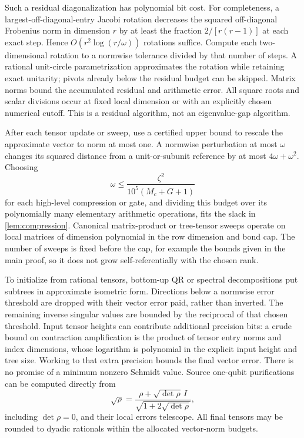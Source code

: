 \documentclass[11pt,reqno]{amsart}
\numberwithin{equation}{section}
\theoremstyle{definition}
\theoremstyle{remark}
\begin{document}
Such a residual diagonalization has polynomial bit cost. For completeness, a largest-off-diagonal-entry Jacobi rotation decreases the squared off-diagonal Frobenius norm in dimension $r$ by at least the fraction $2/[r(r-1)]$ at each exact step. Hence $O(r^2\log(r/\omega))$ rotations suffice. Compute each two-dimensional rotation to a normwise tolerance divided by that number of steps. A rational unit-circle parametrization approximates the rotation while retaining exact unitarity; pivots already below the residual budget can be skipped. Matrix norms bound the accumulated residual and arithmetic error. All square roots and scalar divisions occur at fixed local dimension or with an explicitly chosen numerical cutoff. This is a residual algorithm, not an eigenvalue-gap algorithm.

After each tensor update or sweep, use a certified upper bound to rescale the approximate vector to norm at most one. A normwise perturbation at most $\omega$ changes its squared distance from a unit-or-subunit reference by at most $4\omega+\omega^2$. Choosing
\[
 \omega\leq\frac{\zeta^2}{10^5(M_c+G+1)}
\]
for each high-level compression or gate, and dividing this budget over its polynomially many elementary arithmetic operations, fits the slack in \cref{lem:compression}. Canonical matrix-product or tree-tensor sweeps operate on local matrices of dimension polynomial in the row dimension and bond cap. The number of sweeps is fixed before the cap, for example the bounds given in the main proof, so it does not grow self-referentially with the chosen rank.

To initialize from rational tensors, bottom-up QR or spectral decompositions put subtrees in approximate isometric form. Directions below a normwise error threshold are dropped with their vector error paid, rather than inverted. The remaining inverse singular values are bounded by the reciprocal of that chosen threshold. Input tensor heights can contribute additional precision bits: a crude bound on contraction amplification is the product of tensor entry norms and index dimensions, whose logarithm is polynomial in the explicit input height and tree size. Working to that extra precision bounds the final vector error. There is no promise of a minimum nonzero Schmidt value. Source one-qubit purifications can be computed directly from
\[
 \sqrt\rho=\frac{\rho+\sqrt{\det\rho}\,I}{\sqrt{1+2\sqrt{\det\rho}}},
\]
including $\det\rho=0$, and their local errors telescope. All final tensors may be rounded to dyadic rationals within the allocated vector-norm budgets.
\end{document}

